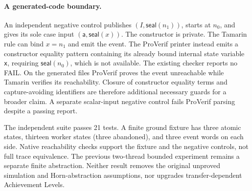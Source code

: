 \paragraph{A generated-code boundary.}
An independent negative control publishes $(I,\mathsf{seal}(n_1))$,
starts at $n_0$, and gives its sole case input
$(\mathsf{a},\mathsf{seal}(x))$. The constructor is private.
The Tamarin rule can bind $x=n_1$ and emit the event. The ProVerif
printer instead emits a constructor equality pattern containing its
already bound internal state variable \texttt{x}, requiring
$\mathsf{seal}(n_0)$, which is not available. The existing checker
reports no FAIL. On the generated files ProVerif proves the event
unreachable while Tamarin verifies its reachability. Closure of
constructor equality terms and capture-avoiding identifiers are therefore
additional necessary guards for a broader claim. A separate scalar-input
negative control fails ProVerif parsing despite a passing report.

The independent suite passes 21 tests. A finite ground fixture has three
atomic states, thirteen worker states (three abandoned), and three event
words on each side. Native reachability checks support the fixture and
the negative controls, not full trace equivalence. The previous two-thread
bounded experiment remains a separate finite abstraction. Neither result
removes the original unproved simulation and Horn-abstraction assumptions,
nor upgrades transfer-dependent Achievement Levels.
